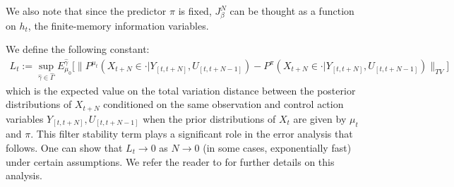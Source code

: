\documentclass[11pt]{article}
\newcommand{\dd}{\mathrm{d}}
\begin{document}
We also note that since the predictor $\pi$ is fixed, $J_\beta^N$ can be thought as a function on $h_t$, the finite-memory information variables. %




We define the following constant:
\begin{align}\label{loss_constant}
L_t:=\sup_{\hat{\gamma}\in\hat{\Gamma}}E_{\mu_0}^{\hat{\gamma}}\bigg[\|P^{\mu_t}(X_{t+N}\in\cdot|Y_{[t,t+N]},U_{[t,t+N-1]})
-P^{\pi}(X_{t+N}\in\cdot|Y_{[t,t+N]},U_{[t,t+N-1]})\|_{TV}\bigg]
\end{align} 
which is the expected value on the total variation distance between the posterior distributions of $X_{t+N}$ conditioned on the same observation and control action variables $Y_{[t,t+N]},U_{[t,t+N-1]}$ when the prior distributions of $X_{t}$ are given by $\mu_t$ and $\pi$. This filter stability term plays a significant role in the error analysis that follows. One can show that $L_t \to 0$ as $N\to 0$ (in some cases, exponentially fast) under certain assumptions. We refer the reader to \cite{kara2020near,kara2023convergence,mcdonald2020exponential} for further details on this analysis. %
\end{document}
